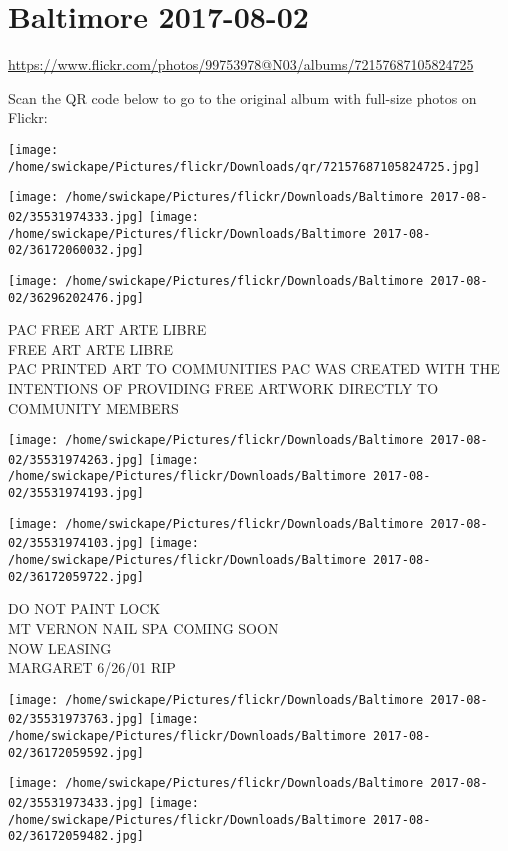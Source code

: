 \documentclass[10pt,letterpaper]{article}
\title{}
\author{}
\date{}
\begin{document}
\section*{Baltimore 2017-08-02}

\url{https://www.flickr.com/photos/99753978@N03/albums/72157687105824725}

Scan the QR code below to go to the original album with full-size photos on Flickr:

\texttt{[image: /home/swickape/Pictures/flickr/Downloads/qr/72157687105824725.jpg]}
\pagebreak

\texttt{[image: /home/swickape/Pictures/flickr/Downloads/Baltimore 2017-08-02/35531974333.jpg]}
\texttt{[image: /home/swickape/Pictures/flickr/Downloads/Baltimore 2017-08-02/36172060032.jpg]}

\vspace{0.25in}
\texttt{[image: /home/swickape/Pictures/flickr/Downloads/Baltimore 2017-08-02/36296202476.jpg]}

PAC FREE ART ARTE LIBRE\\
FREE ART ARTE LIBRE\\
PAC PRINTED ART TO COMMUNITIES PAC WAS CREATED WITH THE INTENTIONS OF PROVIDING FREE ARTWORK DIRECTLY TO COMMUNITY MEMBERS
\pagebreak

\texttt{[image: /home/swickape/Pictures/flickr/Downloads/Baltimore 2017-08-02/35531974263.jpg]}
\texttt{[image: /home/swickape/Pictures/flickr/Downloads/Baltimore 2017-08-02/35531974193.jpg]}

\texttt{[image: /home/swickape/Pictures/flickr/Downloads/Baltimore 2017-08-02/35531974103.jpg]}
\texttt{[image: /home/swickape/Pictures/flickr/Downloads/Baltimore 2017-08-02/36172059722.jpg]}

DO NOT PAINT LOCK\\
MT VERNON NAIL SPA COMING SOON\\
NOW LEASING\\
MARGARET 6/26/01 RIP
\pagebreak

\texttt{[image: /home/swickape/Pictures/flickr/Downloads/Baltimore 2017-08-02/35531973763.jpg]}
\texttt{[image: /home/swickape/Pictures/flickr/Downloads/Baltimore 2017-08-02/36172059592.jpg]}

\texttt{[image: /home/swickape/Pictures/flickr/Downloads/Baltimore 2017-08-02/35531973433.jpg]}
\texttt{[image: /home/swickape/Pictures/flickr/Downloads/Baltimore 2017-08-02/36172059482.jpg]}
\end{document}
